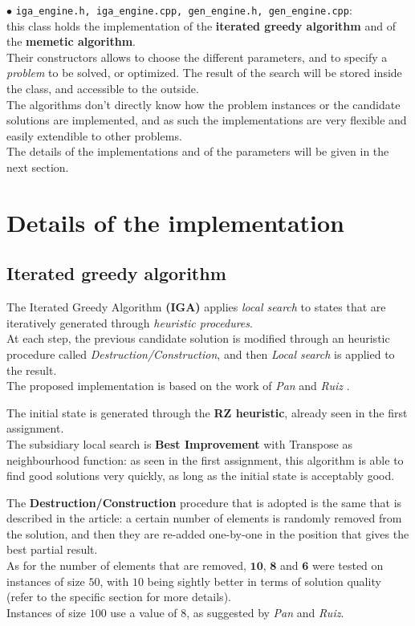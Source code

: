 \documentclass[
12pt,
a4paper,
oneside,
headinclude,
footinclude]{article}
\theoremstyle{definition} %
\begin{document}
$\bullet$ \texttt{iga\_engine.h, iga\_engine.cpp, gen\_engine.h, gen\_engine.cpp}:\\
this class holds the implementation of the \textbf{iterated greedy algorithm} and of the \textbf{memetic algorithm}.\\
Their constructors allows to choose the different parameters, and to specify a \textit{problem} to be solved, or optimized.
The result of the search will be stored inside the class, and accessible to the outside.\\
The algorithms don't directly know how the problem instances or the candidate solutions are implemented, and as such the implementations are very flexible and easily extendible to other problems.\\
The details of the implementations and of the parameters will be given in the next section.

 

\section{Details of the implementation}
\subsection{Iterated greedy algorithm}
The Iterated Greedy Algorithm \textbf{(IGA)} applies \textit{local search} to states that are iteratively generated through \textit{heuristic procedures}.\\
At each step, the previous candidate solution is modified through an heuristic procedure called \textit{Destruction/Construction}, and then \textit{Local search} is applied to the result.\\
The proposed implementation is based on the work of \textit{Pan} and \textit{Ruiz} \cite{pan2012local}.

The initial state is generated through the \textbf{RZ heuristic}, already seen in the first assignment.\\
The subsidiary local search is \textbf{Best Improvement} with {Transpose} as neighbourhood function: as seen in the first assignment, this algorithm is able to find good solutions very quickly, as long as the initial state is acceptably good.

The \textbf{Destruction/Construction} procedure that is adopted is the same that is described in the article: a certain number of elements is randomly removed from the solution, and then they are re-added one-by-one in the position that gives the best partial result.\\
As for the number of elements that are removed, $\boldsymbol{10}$, $\boldsymbol{8}$ and $\boldsymbol{6}$ were tested on instances of size $50$, with $10$ being sightly better in terms of solution quality (refer to the specific section for more details).\\
Instances of size $100$ use a value of $8$, as suggested by \textit{Pan} and \textit{Ruiz}.
\end{document}
